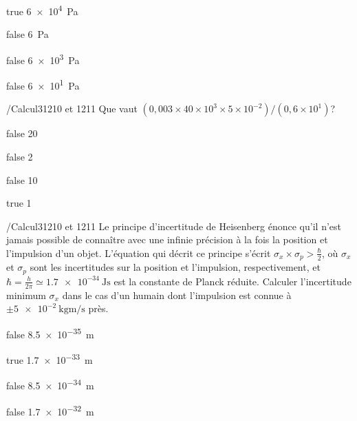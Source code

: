 \documentclass[11pt]{article}
\begin{document}
            \begin{reponses}
                \item[true] \SI{6e4}{\pascal}
                \item[false] \SI{6}{\pascal}
                \item[false] \SI{6e3}{\pascal}
                \item[false] \SI{6e1}{\pascal}
            \end{reponses}
        
        	\begin{question}{/}{Calcul}{3}{1210 et 1211}
				Que vaut $\left(0,003 \times 40 \times 10^3 \times 5 \times 10^{-2} \right)/\left(0,6 \times 10^{1} \right) $?
            \end{question}

            \begin{reponses}
            	\item[false] 20
            	\item[false] 2
                \item[false] 10
                \item[true] 1
            \end{reponses}

            \begin{question}{/}{Calcul}{3}{1210 et 1211}
                Le principe d'incertitude de Heisenberg énonce qu'il n'est jamais possible de connaître avec une infinie précision à la fois la position et l'impulsion d'un objet. L'équation qui décrit ce principe s'écrit $\sigma_x \times \sigma_p > \frac{\hbar}{2}$, où $\sigma_x$ et $\sigma_p$ sont les incertitudes sur la position et l'impulsion, respectivement, et $\hbar = \frac{h}{2\pi} \simeq \SI{1,7e-34}{\joule\second}$ est la constante de Planck réduite. Calculer l'incertitude minimum $\sigma_x$ dans le cas d'un humain dont l'impulsion est connue à $\pm \SI{5e-2}{\kilo\gram\meter\per\second}$ près.
            \end{question}

            \begin{reponses}
                \item[false] \SI{8,5e-35}{\meter}
                \item[true] \SI{1,7 e-33}{\meter}
                \item[false] \SI{8,5e-34}{\meter}
                \item[false] \SI{1,7e-32}{\meter}
            \end{reponses}
            
\end{document}
